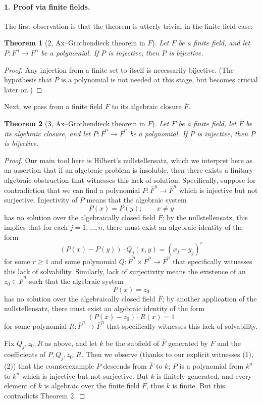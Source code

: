 \documentclass[UTF8,11pt]{ctexart}
\newtheorem*{theorem}{Theorem}
\theoremstyle{definition}
\begin{document}
\paragraph{1. Proof via finite fields.}
The first observation is that the theorem is utterly trivial in the finite field case:
\begin{theorem}[2, Ax--Grothendieck theorem in $F$]
Let $F$ be a finite field, and let $P:F^n\to F^n$ be a polynomial. If $P$ is injective, then $P$ is bijective.
\end{theorem}
\begin{proof}
Any injection from a finite set to itself is necessarily bijective. (The hypothesis that $P$ is a polynomial is not needed at this stage, but becomes crucial later on.)
\end{proof}
Next, we pass from a finite field $F$ to its algebraic closure $\overline F$.
\begin{theorem}[3, Ax--Grothendieck theorem in $\overline F$]
Let $F$ be a finite field, let $\overline F$ be its algebraic closure, and let $P:\overline F^n\to\overline F^n$ be a polynomial. If $P$ is injective, then $P$ is bijective.
\end{theorem}
\begin{proof}
Our main tool here is Hilbert's nullstellensatz, which we interpret here as an assertion that if an algebraic problem is insoluble, then there exists a finitary algebraic obstruction that witnesses this lack of solution. Specifically, suppose for contradiction that we can find a polynomial $P:\overline F^n\to\overline F^n$ which is injective but not surjective. Injectivity of $P$ means that the algebraic system
\[P(x)=P(y);\qquad x\ne y\]
has no solution over the algebraically closed field $\overline F$; by the nullstellensatz, this implies that for each $j=1,\dots,n$, there must exist an algebraic identity of the form
\[(P(x)-P(y))\cdot Q_j(x,y)=(x_j-y_j)^r \tag{1}\]
for some $r\ge1$ and some polynomial $Q:\overline F^n\times\overline F^n\to\overline F^n$ that specifically witnesses this lack of solvability. Similarly, lack of surjectivity means the existence of an $z_0\in\overline F^n$ such that the algebraic system
\[P(x)=z_0\]
has no solution over the algebraically closed field $\overline F$; by another application of the nullstellensatz, there must exist an algebraic identity of the form
\[(P(x)-z_0)\cdot R(x)=1 \tag{2}\]
for some polynomial $R:\overline F^n\to\overline F^n$ that specifically witnesses this lack of solvability.

Fix $Q_j,z_0,R$ as above, and let $k$ be the subfield of $\overline F$ generated by $F$ and the coefficients of $P,Q_j,z_0,R$. Then we observe (thanks to our explicit witnesses (1), (2)) that the counterexample $P$ descends from $\overline F$ to $k$; $P$ is a polynomial from $k^n$ to $k^n$ which is injective but not surjective. But $k$ is finitely generated, and every element of $k$ is algebraic over the finite field $F$, thus $k$ is finite. But this contradicts Theorem 2.
\end{proof}
\end{document}
